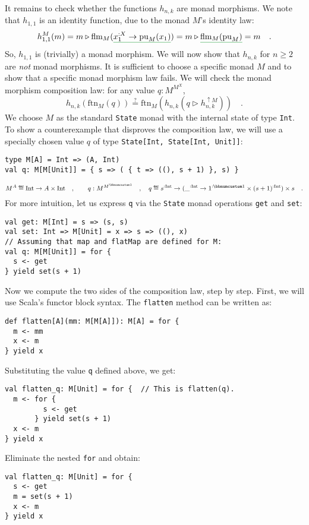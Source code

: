 It remains to check whether the functions $h_{n,k}$ are monad morphisms.
We note that $h_{1,1}$ is an identity function, due to the monad
$M$\textsf{'}s identity law:
\[
h_{1,1}^{M}(m)=m\triangleright\text{flm}_{M}(\gunderline{x_{1}^{:X}\rightarrow\text{pu}_{M}(x_{1})})=m\triangleright\gunderline{\text{flm}_{M}(\text{pu}_{M})}=m\quad.
\]
So, $h_{1,1}$ is (trivially) a monad morphism. We will now show that
$h_{n,k}$ for $n\ge2$ are \emph{not} monad morphisms. It is sufficient
to choose a specific monad $M$ and to show that a specific monad
morphism law fails. We will check the monad morphism composition law:
for any value $q:M^{M^{X}}$, 
\[
h_{n,k}(\text{ftn}_{M}(q))\overset{?}{=}\text{ftn}_{M}(h_{n,k}(q\triangleright h_{n,k}^{\uparrow M}))\quad.
\]
We choose $M$ as the standard \lstinline!State! monad with the internal
state of type \lstinline!Int!. To show a counterexample that disproves
the composition law, we will use a specially chosen value $q$ of
type \lstinline!State[Int, State[Int, Unit]]!:
\begin{lstlisting}
type M[A] = Int => (A, Int)
val q: M[M[Unit]] = { s => ( { t => ((), s + 1) }, s) }
\end{lstlisting}
\[
M^{A}\triangleq\text{Int}\rightarrow A\times\text{Int}\quad,\quad\quad q:M^{M^{\bbnum 1}}\quad,\quad q\triangleq s^{:\text{Int}}\rightarrow(\_^{:\text{Int}}\rightarrow1^{:\bbnum 1}\times(s+1)^{:\text{Int}})\times s\quad.
\]
For more intuition, let us express \lstinline!q! via the \lstinline!State!
monad operations \lstinline!get! and \lstinline!set!:
\begin{lstlisting}
val get: M[Int] = s => (s, s)
val set: Int => M[Unit] = x => s => ((), x)
// Assuming that map and flatMap are defined for M:
val q: M[M[Unit]] = for {
  s <- get
} yield set(s + 1)
\end{lstlisting}
Now we compute the two sides of the composition law, step by step.
First, we will use Scala\textsf{'}s functor block syntax. The \lstinline!flatten!
method can be written as:
\begin{lstlisting}
def flatten[A](mm: M[M[A]]): M[A] = for {
  m <- mm
  x <- m
} yield x
\end{lstlisting}
Substituting the value \lstinline!q! defined above, we get:
\begin{lstlisting}
val flatten_q: M[Unit] = for {  // This is flatten(q).
  m <- for {
         s <- get
       } yield set(s + 1)
  x <- m
} yield x
\end{lstlisting}
Eliminate the nested \lstinline!for! and obtain:
\begin{lstlisting}
val flatten_q: M[Unit] = for {
  s <- get
  m = set(s + 1)
  x <- m
} yield x
\end{lstlisting}
